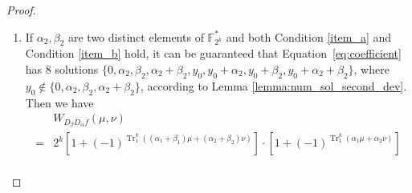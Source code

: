 \documentclass{article}
\newcommand{\F}{\mathbb{F}}
\newcommand{\0}{\textbf{0}}
\newcommand{\1}{\textbf{1}}
\newcommand{\TRACE}{\operatorname{Tr}_1^k}
\theoremstyle{plain}
\begin{document}
\begin{proof}
\begin{enumerate}[label=\textbf{Case \arabic*},wide = 0pt]
            \item If $\alpha_2,\beta_2$ are two distinct elements of $\F_{2^k}^*$ and both Condition \ref{item_a} and Condition \ref{item_b} hold,
            it can be guaranteed that Equation~\eqref{eq:coefficient} has $8$ solutions $\{0,\alpha_2,\beta_2,\alpha_2+\beta_2,y_0,y_0+\alpha_2,y_0+\beta_2,y_0+\alpha_2+\beta_2\}$, where $y_0\notin\{0,\alpha_2,\beta_2,\alpha_2+\beta_2\}$, according to Lemma \ref{lemma:num_sol_second_dev}.
            Then we have
            \begin{align*}
            &W_{D_{\beta}D_{\alpha}f}(\mu,\nu)\nonumber\\
                =&2^k\left[1+(-1)^{\TRACE\left((\alpha_1+\beta_1)\mu+ (\alpha_2+\beta_2)\nu\right)}\right]\cdot
                \left[1+(-1)^{\TRACE\left(\alpha_1\mu+\alpha_2\nu\right)}\right]\nonumber\\

\end{align*}
\end{enumerate}
\end{proof}
\end{document}
